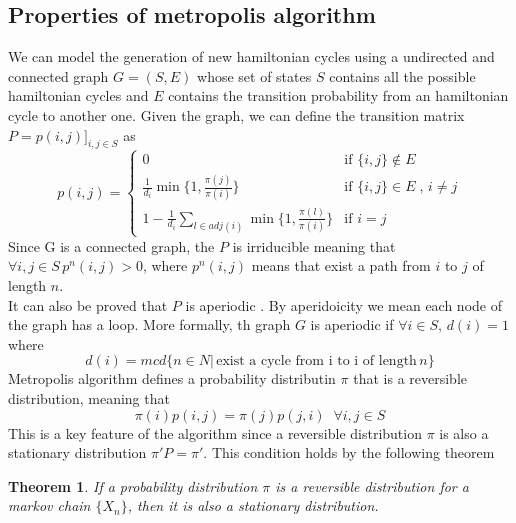 \documentclass{article}
\newtheorem{theorem}{Theorem}
\begin{document}
\subsection{Properties of metropolis algorithm}
We can model the generation of new hamiltonian cycles using a undirected and connected graph $G = (S,E)$ whose set of states $S$ contains all the possible hamiltonian cycles and $E$ contains the transition probability from an hamiltonian cycle to another one. Given the graph, we can define the transition matrix $P=p(i,j)]_{i,j\in S}$ as
\begin{equation}
p(i,j) =  \begin{cases} 
	0\, & \mbox{if } \{i,j\} \notin E  \\ 
	\frac{1}{d_i} \min\{1,\frac{\pi(j)}{\pi(i)}\} & \mbox{if }  \{i,j\} \in E \;,\, i \neq j\\
	1-\frac{1}{d_i} \sum_{l \in adj(i)} \min\{1,\frac{\pi(l)}{\pi(i)}\}  & \mbox{if }  i = j 
\end{cases}
\end{equation}
Since G is a connected graph, the $P$ is irriducible meaning that $\forall i,j \in S \, p^n(i,j) > 0$, where $p^n(i,j)$ means that exist a path from $i$ to $j$ of length $n$.\\
It can also be proved that $P$ is aperiodic \cite{metropolis}. By aperidoicity we mean each node of the graph has a loop. More formally, th graph $G$ is aperiodic if $\forall i \in S, \,d(i)  = 1$ where
\begin{equation}
d(i) = mcd \{n \in N | \, \text{exist a cycle from i to i of length} \, n\}
\end{equation}
Metropolis algorithm defines a probability distributin $\pi$ that is a reversible distribution, meaning that
\begin{equation}
	\pi(i)p(i,j) = \pi(j)p(j,i) \;\; \forall i,j \in S
\end{equation}
This is a key feature of the algorithm since a reversible distribution $\pi$ is also a stationary distribution $\pi'P=\pi'$. This condition holds by the following theorem
\begin{theorem}
If a probability distribution $\pi$ is a reversible distribution for a markov chain $ \{X_n\} $, then it is also a stationary distribution.
\end{theorem}
\end{document}
